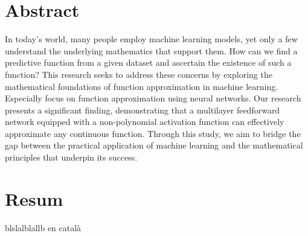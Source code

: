 \documentclass[../../main.tex]{subfiles}
\begin{document}
\chapter*{Abstract}\label{ch:abstract} 
\noindent In today's world, many people employ machine learning models, yet only a few understand the underlying mathematics that support them. How can we find a predictive function from a given dataset and ascertain the existence of such a function? This research seeks to address these concerns by exploring the mathematical foundations of function approximation in machine learning. Especially focus on function approximation using neural networks. Our research presents a significant finding, demonstrating that a multilayer feedforward network equipped with a non-polynomial activation function can effectively approximate any continuous function. Through this study, we aim to bridge the gap between the practical application of machine learning and the mathematical principles that underpin its success.


\chapter*{Resum}



blslalblallb en català
\end{document}
